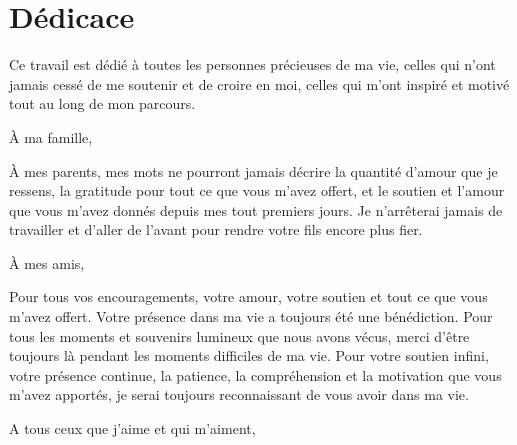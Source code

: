\vspace{38mm}
\chapter*{\Huge \centering Dédicace}
\begin{center}
    \it 

    \begingroup
    
    Ce travail est dédié à toutes les personnes précieuses de ma vie, celles qui n'ont jamais cessé de me soutenir et de croire en moi, celles qui m'ont inspiré et motivé tout au long de mon parcours.
    
     \vspace{4mm}
    \endgroup
    
    \begingroup
    \Large
          À ma famille,
    \vspace{4mm}
    
    \endgroup
    \begingroup
     À mes parents, mes mots ne pourront jamais décrire la quantité d'amour que je ressens, la gratitude pour tout ce que vous m'avez offert, et le soutien et l'amour que vous m'avez donnés depuis mes tout premiers jours. Je n'arrêterai jamais de travailler et d'aller de l'avant pour rendre votre fils encore plus fier.
    
     \vspace{4mm}
    \endgroup
    
    
    \begingroup
    \Large
     À mes amis,
    \vspace{4mm}
    
    \endgroup
    \begingroup
    
     Pour tous vos encouragements, votre amour, votre soutien et tout ce que vous m'avez offert. Votre présence dans ma vie a toujours été une bénédiction. Pour tous les moments et souvenirs lumineux que nous avons vécus, merci d'être toujours là pendant les moments difficiles de ma vie. Pour votre soutien infini, votre présence continue, la patience, la compréhension et la motivation que vous m'avez apportés, je serai toujours reconnaissant de vous avoir dans ma vie.
     \vspace{4mm}
    \endgroup
    
    
    \begingroup
    \Large
    
     \vspace{4mm}
    \endgroup
    
    
    
    \begingroup
    \Large
     A tous ceux que j’aime et qui m’aiment,
    \vspace{4mm}
    

\end{center}
